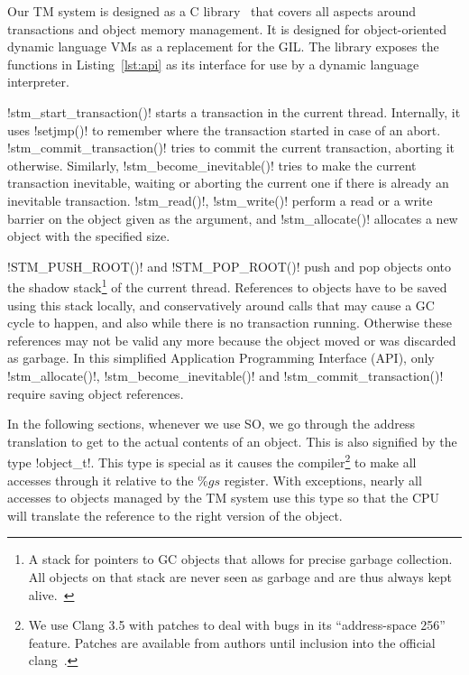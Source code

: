 \documentclass{sigplanconf}
\makeatletter
\renewcommand\lstinline[1][]{%
  \Collectverb{\@@myverb}%
}
\def\@@myverb#1{%
    \begingroup
    \fboxsep=0.2em
    \colorbox{verylightgray}{\oldlstinline|#1|}%
    \endgroup
}
\makeatother
\begin{document}
Our TM system is designed as a C library~\cite{stmgc-c7} that covers
all aspects around transactions and object memory management. It is
designed for object-oriented dynamic language VMs as a replacement for
the GIL.  The library exposes the functions in Listing~\ref{lst:api}
as its interface for use by a dynamic language interpreter.

\lstinline!stm_start_transaction()!  starts a transaction in the
current thread. Internally, it uses \lstinline!setjmp()! to remember
where the transaction started in case of an abort.
\lstinline!stm_commit_transaction()! tries to commit the current
transaction, aborting it otherwise. Similarly,
\lstinline!stm_become_inevitable()!  tries to make the current
transaction inevitable, waiting or aborting the current one if there
is already an inevitable transaction.
 \lstinline!stm_read()!, \lstinline!stm_write()!  perform
a read or a write barrier on the object given as the argument, and
\lstinline!stm_allocate()!  allocates a new object with the specified
size.

\lstinline!STM_PUSH_ROOT()! and \lstinline!STM_POP_ROOT()!
push and pop objects onto the shadow stack\footnote{A stack for pointers
  to GC objects that allows for precise garbage collection. All objects
  on that stack are never seen as garbage and are thus always kept
  alive.~\cite{fergus02}} of the current thread.  References to objects
have to be saved using this stack locally, and conservatively around calls that may cause a GC
cycle to happen, and also while there is no transaction
running. Otherwise these references may not be valid any more because
the object moved or was discarded as garbage. In this simplified Application
Programming Interface (API), only \lstinline!stm_allocate()!,
\lstinline!stm_become_inevitable()! and
\lstinline!stm_commit_transaction()!  require saving object
references.

In the following sections, whenever we use SO, we go through the
address translation to get to the actual contents of an object. This
is also signified by the type \lstinline!object_t!.  This type is
special as it causes the compiler\footnote{We use Clang 3.5 with
  patches to deal with bugs in its ``address-space 256''
  feature. Patches are available from authors until inclusion into the
  official clang~\cite{stmgc-c7}.} to make all accesses through it
relative to the $\%gs$ register.  With exceptions, nearly all accesses
to objects managed by the TM system use this type so that the CPU will
translate the reference to the right version of the object.
\medskip   %
\end{document}
